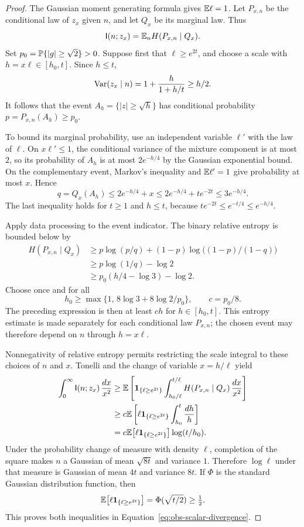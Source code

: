 \begin{proof}
The Gaussian moment generating formula gives $\mathbb E\ell=1$.
Let $P_{x,n}$ be the conditional law of $z_x$ given $n$, and
let $Q_x$ be its marginal law.  Thus
\[
 \mathsf I(n;z_x)=\mathbb E_n H(P_{x,n}\mid Q_x).
\]
Set $p_0=\mathbb P\{|g|\ge\sqrt2\}>0$.  Suppose first that
$\ell\ge e^{2t}$, and choose a scale with
$h=x\ell\in[h_0,t]$.  Since $h\le t$,
\[
 \operatorname{Var}(z_x\mid n)=1+\frac{h}{1+h/t}\ge h/2.
\]
It follows that the event $A_h=\{|z|\ge\sqrt h\}$ has
conditional probability $p=P_{x,n}(A_h)\ge p_0$.

To bound its marginal probability, use an independent variable
$\ell'$ with the law of $\ell$.  On $x\ell'\le1$, the
conditional variance of the mixture component is at most $2$,
so its probability of $A_h$ is at most $2e^{-h/4}$ by the
Gaussian exponential bound.  On the complementary event,
Markov's inequality and $\mathbb E\ell'=1$ give probability at most
$x$.  Hence
\begin{equation}\label{eq:obs-binary-marginal-bound}
 q=Q_x(A_h)\le2e^{-h/4}+x
       \le2e^{-h/4}+te^{-2t}\le3e^{-h/4}.
\end{equation}
The last inequality holds for $t\ge1$ and $h\le t$, because
$te^{-2t}\le e^{-t/4}\le e^{-h/4}$.

Apply data processing to the event indicator.  The binary
relative entropy is bounded below by
\begin{align*}
 H(P_{x,n}\mid Q_x)
 &\ge p\log(p/q)+(1-p)\log\big((1-p)/(1-q)\big)\\
 &\ge p\log(1/q)-\log2\\
 &\ge p_0(h/4-\log3)-\log2.
\end{align*}
Choose once and for all
\[
 h_0\ge\max\{1,\,8\log3+8\log2/p_0\},
 \qquad c=p_0/8.
\]
The preceding expression is then at least $ch$ for
$h\in[h_0,t]$.  This entropy estimate is made separately for
each conditional law $P_{x,n}$; the chosen event may therefore
depend on $n$ through $h=x\ell$.

Nonnegativity of relative entropy permits restricting the scale
integral to these choices of $n$ and $x$.  Tonelli and the change
of variable $x=h/\ell$ yield
\begin{align*}
 \int_0^\infty\mathsf I(n;z_x)\,\frac{dx}{x^2}
 &\ge\mathbb E\left[\mathbf 1_{\{\ell\ge e^{2t}\}}
       \int_{h_0/\ell}^{t/\ell}
           H(P_{x,n}\mid Q_x)\,\frac{dx}{x^2}\right]\\
 &\ge c\mathbb E\left[\ell\mathbf 1_{\{\ell\ge e^{2t}\}}
                         \int_{h_0}^t\frac{dh}{h}\right]\\
 &=c\mathbb E\big[\ell\mathbf 1_{\{\ell\ge e^{2t}\}}\big]\log(t/h_0).
\end{align*}
Under the probability change of measure with density $\ell$,
completion of the square makes $n$ a Gaussian of mean
$\sqrt{8t}$ and variance $1$.  Therefore $\log\ell$ under that
measure is Gaussian of mean $4t$ and variance $8t$.  If $\Phi$
is the standard Gaussian distribution function, then
\[
 \mathbb E\big[\ell\mathbf 1_{\{\ell\ge e^{2t}\}}\big]
   =\Phi(\sqrt{t/2})\ge\tfrac12.
\]
This proves both inequalities in
Equation~\eqref{eq:obs-scalar-divergence}.
\end{proof}

